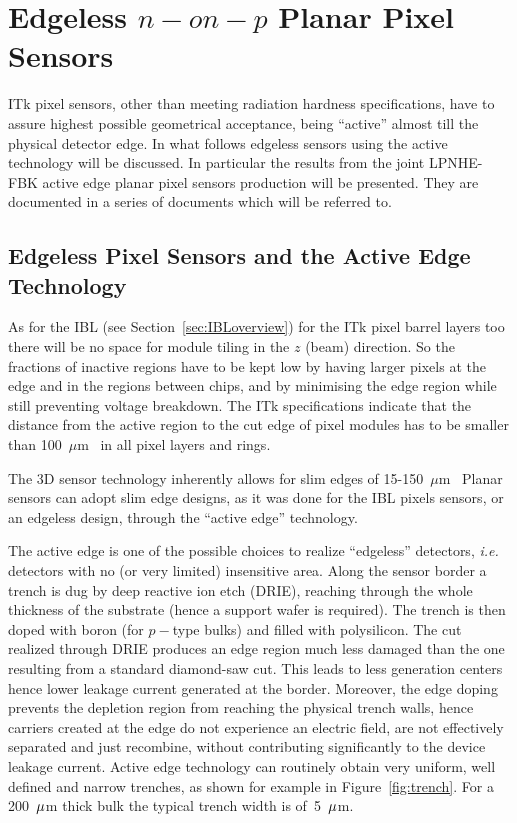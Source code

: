 \section{Edgeless $n-on-p$ Planar Pixel Sensors}
\label{sec:edgeless}

ITk pixel sensors, other than meeting radiation hardness specifications, have to assure highest 
possible geometrical acceptance, being ``active'' almost till the physical detector edge.
In what follows edgeless sensors using the active technology will be discussed.  
In particular the results from the joint LPNHE-FBK  active edge planar pixel sensors production will be presented. They are documented in a series of documents which will be referred to.

\subsection{Edgeless Pixel Sensors and the Active Edge Technology}

As for the IBL (see Section~\ref{sec:IBLoverview}) for the ITk pixel barrel layers too there will be no 
space for module tiling in the $z$ (beam) direction. So the fractions of inactive regions have to be kept 
low by having larger pixels at the edge and in the regions between chips, and by minimising the edge 
region while still preventing voltage breakdown. 
 The ITk specifications indicate that the distance from the active region to the cut edge of pixel modules has to be smaller than 100~$\mu$m~\cite{ITkStripsTDR} in all pixel layers and rings.



The 3D sensor technology inherently allows for slim edges of 15-150~$\mu$m~\cite{1748-0221-10-03-C03031} 
Planar sensors can adopt slim edge designs, as it was done for the IBL pixels sensors, or 
an edgeless design, through the ``active edge'' technology.


The active edge is one of the possible choices to realize ``edgeless'' detectors, {\it i.e.} detectors with no (or very limited) insensitive area. Along the sensor border a trench is dug by deep reactive ion etch (DRIE), reaching through the whole thickness of the substrate (hence a support wafer is required).  The  trench is then doped with boron (for $p-$type bulks) and  filled with polysilicon. The cut realized through DRIE produces an edge region
much less damaged than the one resulting from a standard diamond-saw cut. This leads to less generation centers hence lower leakage current generated at the border. Moreover, the edge doping prevents the depletion region from reaching the physical trench walls, hence carriers created at the edge  do not experience an electric field, are not effectively separated and just recombine, without contributing significantly to the device leakage current.
Active edge technology can routinely obtain very uniform, well defined and narrow trenches, as shown for example in Figure~\ref{fig:trench}. For a 200~${\rm \mu}$m thick bulk the typical trench width is of~5~${\rm \mu}$m.

